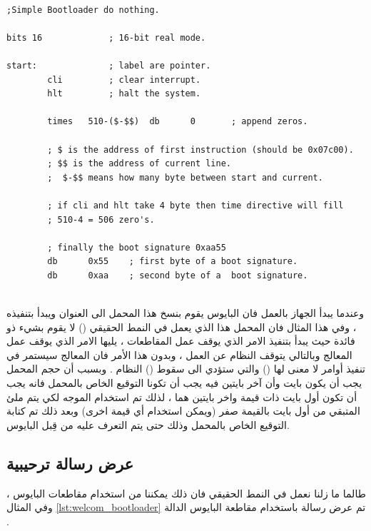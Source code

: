 \documentclass[document.tex]{subfiles}
\begin{document}
%

\begin{english}
\lstset{numberstyle=\tiny,numbers=left,stepnumber=1,numbersep=5pt,tabsize=2,extendedchars=true,breaklines=true,frame=b,showspaces=false, showtabs=false,xleftmargin=10pt,framexleftmargin=10pt,framexrightmargin=5pt,framexbottommargin=4pt,showstringspaces=false,language=[x86masm]Assembler}

\begin{lstlisting}[label=lst:useless_bootloader,caption=\en{Smallest Bootloader}]

;Simple Bootloader do nothing.

bits 16				; 16-bit real mode.

start:				; label are pointer.
		cli			; clear interrupt.		
		hlt			; halt the system.
		
		times	510-($-$$)	db		0		; append zeros.
		
		; $ is the address of first instruction (should be 0x07c00).
		; $$ is the address of current line.
		;  $-$$ means how many byte between start and current.
		
		; if cli and hlt take 4 byte then time directive will fill
		; 510-4 = 506 zero's.
		
		; finally the boot signature 0xaa55
		db		0x55	; first byte of a boot signature.
		db		0xaa	; second byte of a  boot signature.
		
\end{lstlisting}
\end{english}

وعندما يبدأ الجهاز بالعمل فان البايوس يقوم بنسخ هذا المحمل الى العنوان  ويبدأ بتنفيذه ، وفي هذا المثال فان المحمل هذا الذي يعمل في النمط الحقيقي () لا يقوم بشيء ذو فائدة حيث يبدأ بتنفيذ الامر  الذي يوقف عمل المقاطعات ، يليها الامر  الذي يوقف عمل المعالج وبالتالي يتوقف النظام عن العمل ، وبدون هذا الأمر فان المعالج سيستمر في تنفيذ أوامر لا معنى لها () والتي ستؤدي الى سقوط () النظام .  
وبسبب أن حجم المحمل يجب أن يكون  بايت وأن آخر بايتين فيه يجب أن تكونا التوقيع الخاص بالمحمل فانه يجب أن تكون أول  بايت ذات قيمة واخر بايتين هما  ، لذلك تم استخدام الموجه  لكي يتم ملئ المتبقي من أول  بايت بالقيمة صفر (ويمكن استخدام أي قيمة اخرى) وبعد ذلك تم كتابة التوقيع الخاص بالمحمل وذلك حتى يتم التعرف عليه من قِبل البايوس.

\subsection{عرض رسالة ترحيبية}
طالما ما زلنا نعمل في النمط الحقيقي فان ذلك يمكننا من استخدام مقاطعات البايوس ، وفي المثال \ref{lst:welcom_bootloader} تم  عرض رسالة باستخدام مقاطعة البايوس  الدالة  . 
\end{document}
